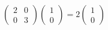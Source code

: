 \begin{equation}
	\begin{pmatrix}
		2 & 0 \\
		0 & 3
	\end{pmatrix}
	\begin{pmatrix}
		1 \\
		0
	\end{pmatrix}
	= 2 \begin{pmatrix} 1 \\ 0 \end{pmatrix}
\end{equation}
